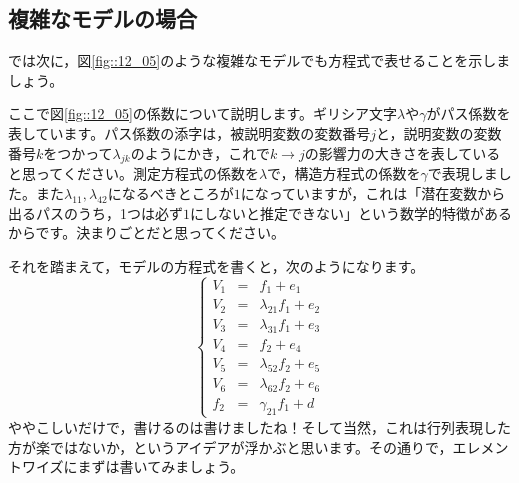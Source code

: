 \documentclass{ltjsbook}
\begin{document}
\subsection{複雑なモデルの場合}

では次に，図\ref{fig::12_05}のような複雑なモデルでも方程式で表せることを示しましょう。

ここで図\ref{fig::12_05}の係数について説明します。ギリシア文字$\lambda$や$\gamma$がパス係数を表しています。パス係数の添字は，被説明変数の変数番号$j$と，説明変数の変数番号$k$をつかって$\lambda_{jk}$のようにかき，これで$k \to j$の影響力の大きさを表していると思ってください。測定方程式の係数を$\lambda$で，構造方程式の係数を$\gamma$で表現しました。また$\lambda_{11},\lambda_{42}$になるべきところが$1$になっていますが，これは「潜在変数から出るパスのうち，1つは必ず$1$にしないと推定できない」という数学的特徴があるからです。決まりごとだと思ってください。

それを踏まえて，モデルの方程式を書くと，次のようになります。
\[ \left \{
	\begin{array}{rcl}
		V_1 & = & f_1 + e_1             \\
		V_2 & = & \lambda_{21}f_1 + e_2 \\
		V_3 & = & \lambda_{31}f_1 + e_3 \\
		V_4 & = & f_2 + e_4             \\
		V_5 & = & \lambda_{52}f_2 + e_5 \\
		V_6 & = & \lambda_{62}f_2 + e_6 \\
		f_2 & = & \gamma_{21}f_1 + d
	\end{array}
	\right .
\]
ややこしいだけで，書けるのは書けましたね！そして当然，これは行列表現した方が楽ではないか，というアイデアが浮かぶと思います。その通りで，エレメントワイズにまずは書いてみましょう。
\end{document}
